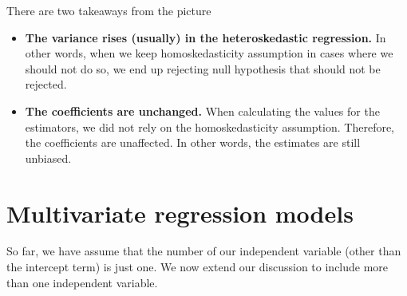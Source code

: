 \documentclass[12pt]{article}
\theoremstyle{definition}
\theoremstyle{property}
\theoremstyle{assumption}
\theoremstyle{example}
\theoremstyle{comment}
\begin{document}
There are two takeaways from the picture
\begin{itemize}
\item \textbf{The variance rises (usually) in the heteroskedastic regression.} In other words, when we keep homoskedasticity assumption in cases where we should not do so, we end up rejecting null hypothesis that should not be rejected.
\item \textbf{The coefficients are unchanged.} When calculating the values for the estimators, we did not rely on the homoskedasticity assumption. Therefore, the coefficients are unaffected. In other words, the estimates are still unbiased.
\end{itemize}

\section{Multivariate regression models}
So far, we have assume that the number of our independent variable (other than the intercept term) is just one. We now extend our discussion to include more than one independent variable. 
\end{document}
